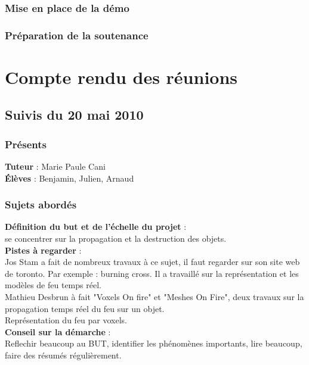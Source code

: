 \documentclass[a4paper,10pt]{article}
\begin{document}
\subsubsection{Mise en place de la démo}


\subsubsection{Préparation de la soutenance}

\section{Compte rendu des réunions}

\subsection{Suivis du  20 mai 2010}

\subsubsection{Présents}
\textbf{Tuteur} : Marie Paule Cani \\
\textbf{Élèves} : Benjamin, Julien, Arnaud \\

\subsubsection{Sujets abordés}
\textbf{Définition du but et de l'échelle du projet} :  \\
se concentrer sur la propagation et la destruction des objets.\\

\textbf{Pistes à regarder} : \\
Jos Stam a fait de nombreux travaux à ce sujet, il faut regarder sur son site web de toronto. Par exemple : burning cross. Il a travaillé sur la représentation et  les modèles de feu temps réel.\\
Mathieu Desbrun à fait "Voxels On fire" et "Meshes On Fire", deux travaux sur la propagation temps réel du feu sur un objet.\\
Représentation du feu par voxels.\\

\textbf{Conseil sur la démarche} : \\
Reflechir beaucoup au BUT,
identifier les phénomènes importants,
lire beaucoup,
faire des résumés régulièrement.\\
\end{document}
